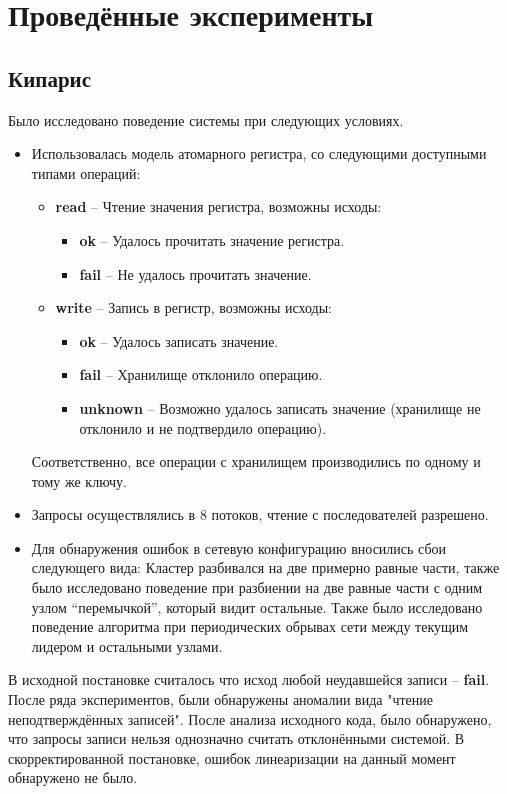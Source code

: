 \documentclass[pdftex,ptm,14pt,a4paper]{extreport}
\theoremstyle{definition}
\begin{document}
\chapter{Проведённые эксперименты}
\section{Кипарис}
Было исследовано поведение системы при следующих условиях.
\begin{itemize}
    \item Использовалась модель атомарного регистра, со следующими доступными типами операций:
        \begin{itemize}
            \item \textbf{read} -- Чтение значения регистра, возможны исходы:
                \begin{itemize}
                    \item \textbf{ok} -- Удалось прочитать значение регистра.
                    \item \textbf{fail} -- Не удалось прочитать значение.
                \end{itemize}
            \item \textbf{write} -- Запись в регистр, возможны исходы:
                \begin{itemize}
                    \item \textbf{ok} -- Удалось записать значение.
                    \item \textbf{fail} --  Хранилище отклонило операцию.
                    \item \textbf{unknown} -- Возможно удалось записать значение
                        (хранилище не отклонило и не подтвердило операцию).
                \end{itemize}
        \end{itemize}
        Соответственно, все операции с хранилищем производились по одному и тому же ключу.
    \item Запросы осуществлялись в 8 потоков, чтение с последователей разрешено.
    \item Для обнаружения ошибок в сетевую конфигурацию вносились сбои следующего вида:
    \subitem Кластер разбивался на две примерно равные части, также было исследовано поведение при разбиении
            на две равные части с одним узлом “перемычкой”, который видит остальные.
    \subitem Также было исследовано поведение алгоритма при периодических обрывах сети между текущим лидером
            и остальными узлами.
\end{itemize}
В исходной постановке считалось что исход любой неудавшейся записи -- \textbf{fail}.
После ряда экспериментов, были обнаружены аномалии вида "чтение неподтверждённых записей".
После анализа исходного кода, было обнаружено, что запросы записи нельзя однозначно считать отклонёнными системой.
В скорректированной постановке, ошибок линеаризации на данный момент обнаружено не было.
\end{document}
